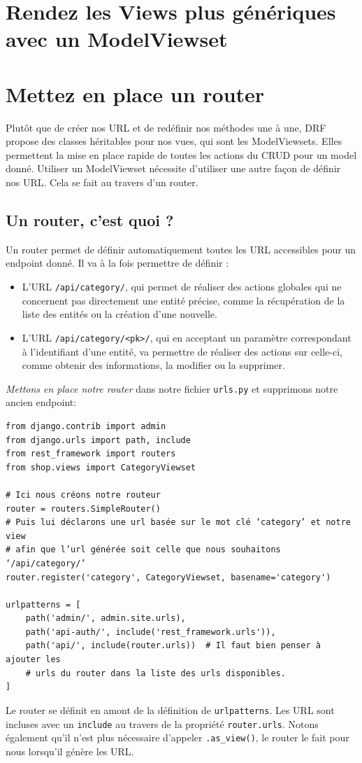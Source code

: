\section{Rendez les Views plus génériques avec un ModelViewset}
\section{Mettez en place un {\color{monOrange}router}}
Plutôt que de créer nos URL et de redéfinir nos méthodes une à une, DRF propose des classes héritables pour nos vues, qui sont les {\color{monOrange}ModelViewsets}. Elles permettent la mise en place rapide de toutes les actions du CRUD pour un model donné. Utiliser un ModelViewset nécessite d’utiliser une autre façon de définir nos URL. Cela se fait au travers d’un {\color{monOrange}router}.
\subsection*{Un router, c’est quoi ?}
Un router permet de définir automatiquement toutes les URL accessibles pour un endpoint donné. Il va à la fois permettre de définir :
\begin{itemize}
\item L’URL  {\tt /api/category/}, qui permet de réaliser des actions globales qui ne concernent pas directement une entité précise, comme la récupération de la liste des entités ou la création d’une nouvelle.
\item L’URL  {\tt /api/category/<pk>/}, qui en acceptant un paramètre correspondant à l’identifiant d’une entité, va permettre de réaliser des actions sur celle-ci, comme obtenir des informations, la modifier ou la supprimer.
\end{itemize}
{\em Mettons en place notre {\color{monOrange}router}} dans notre fichier {\tt urls.py}  et supprimons notre ancien {\color{monOrange}endpoint}: 
\begin{verbatim}
from django.contrib import admin
from django.urls import path, include
from rest_framework import routers
from shop.views import CategoryViewset
 
# Ici nous créons notre routeur
router = routers.SimpleRouter()
# Puis lui déclarons une url basée sur le mot clé ‘category’ et notre view
# afin que l’url générée soit celle que nous souhaitons ‘/api/category/’
router.register('category', CategoryViewset, basename='category')
 
urlpatterns = [
    path('admin/', admin.site.urls),
    path('api-auth/', include('rest_framework.urls')),
    path('api/', include(router.urls))  # Il faut bien penser à ajouter les 
    # urls du router dans la liste des urls disponibles.
]
\end{verbatim}
Le router se définit en amont de la définition de  {\tt urlpatterns}. Les URL sont incluses avec un  {\tt include}  au travers de la propriété  {\tt router.urls}. Notons également qu’il n’est plus nécessaire d'appeler  {\tt .as\_view()}, le router le fait pour nous lorsqu’il génère les URL.

